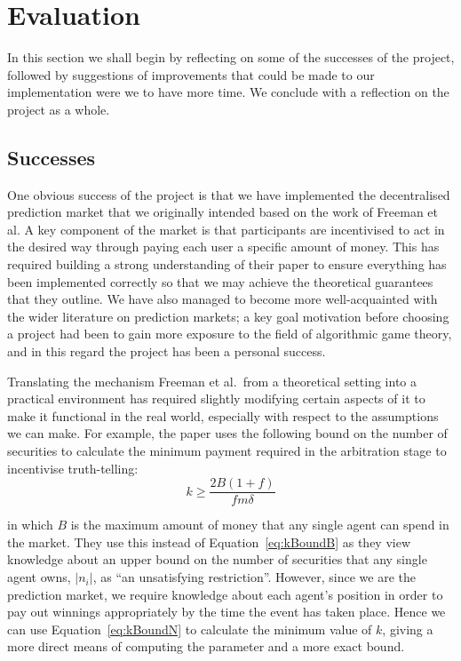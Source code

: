 \section{Evaluation}

\label{sec:evaluation}

In this section we shall begin by reflecting on some of the successes of the
project, followed by suggestions of improvements that could be made to our
implementation were we to have more time. We conclude with a reflection on the
project as a whole.

\subsection{Successes}

One obvious success of the project is that we have implemented the
decentralised prediction market that we originally intended based on the work
of Freeman et al. A key component of the market is that participants are
incentivised to act in the desired way through paying each user a specific
amount of money. This has required building a strong understanding of their
paper to ensure everything has been implemented correctly so that we may
achieve the theoretical guarantees that they outline.  We have also managed to
become more well-acquainted with the wider literature on prediction markets; a
key goal motivation before choosing a project had been to gain more exposure to
the field of algorithmic game theory, and in this regard the project has been a
personal success.

Translating the mechanism Freeman et al.\ from a theoretical setting into a
practical environment has required slightly modifying certain aspects of it to
make it functional in the real world, especially with respect to the
assumptions we can make. For example, the paper uses the following bound on the
number of securities to calculate the minimum payment required in the
arbitration stage to incentivise truth-telling:
%
\begin{equation}
	\label{eq:kBoundB}
	k \ge \frac{2 B (1+f)}{f m \delta}
\end{equation}

in which $B$ is the maximum amount of money that any single agent can spend in
the market. They use this instead of Equation~\ref{eq:kBoundB} as they view
knowledge about an upper bound on the number of securities that any single
agent owns, $|n_i|$, as ``an unsatisfying restriction''. However, since we are
the prediction market, we require knowledge about each agent's position in
order to pay out winnings appropriately by the time the event has taken place.
Hence we can use Equation~\ref{eq:kBoundN} to calculate the minimum value of
$k$, giving a more direct means of computing the parameter and a more exact
bound.

